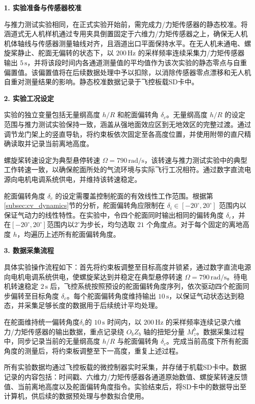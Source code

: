 \textbf{1. 实验准备与传感器校准}

与推力测试实验相同，在正式实验开始前，需完成力/力矩传感器的静态校准。将涵道式无人机样机通过专用夹具倒置固定于六维力/力矩传感器之上，确保无人机机体轴线与传感器测量轴线对齐，且涵道出口平面保持水平。在无人机未通电、螺旋桨静止、舵面无偏转的状态下，以 $200\,\mathrm{Hz}$ 的采样频率连续采集力/力矩传感器输出 $5\,\mathrm{s}$，并将该段时间内各通道测量值的平均值作为该次实验的静态零点与自重偏置值。该偏置值将在后续数据处理中予以扣除，以消除传感器零点漂移和无人机自重对测量结果的影响。静态校准数据记录于飞控板载SD卡中。

\textbf{2. 实验工况设定}

实验的独立变量包括无量纲高度 $h/R$ 和舵面偏转角 $\delta_c$。无量纲高度 $h/R$ 的设定范围与推力测试实验保持一致，涵盖从强地面效应区到无地效区的完整过渡。通过调节龙门架上的竖直导轨，将约束板依次固定至各高度位置，并使用附带的直尺精确读取并记录当前离地高度。

螺旋桨转速设定为典型悬停转速 $\Omega = 790\,\mathrm{rad/s}$，该转速与推力测试实验中的典型工作转速一致，以确保舵面所处的气流环境与实际飞行工况相符。通过数字直流电源向电机电调系统供电，并维持该转速稳定。

舵面偏转角度 $\delta_c$ 的设定需覆盖控制舵面的有效线性工作范围。根据第\ref{subsec:cv_dynamics}节的分析，舵面偏转角应限制在 $\delta_i \in [-20^\circ, 20^\circ]$ 范围内以保证气动力的线性特性。在实验中，令四个舵面同时输出相同的偏转角度 $\delta_c$，并在$[-20^\circ, 20^\circ]$范围内以$2^\circ$为步长，均匀选取 $21$ 个角度点。对于每个固定的离地高度 $h$，均遍历上述所有舵面偏转角度。

\textbf{3. 数据采集流程}

具体实验操作流程如下：首先将约束板调整至目标高度并锁紧，通过数字直流电源向电机电调系统供电，使螺旋桨达到并稳定在典型悬停转速 $\Omega = 790\,\mathrm{rad/s}$。待电机转速稳定 $2\,\mathrm{s}$ 后，飞控系统按照预设的舵面偏转角度序列，依次驱动四个舵面同步偏转至目标角度 $\delta_c$。每个舵面偏转角度维持输出 $10\,\mathrm{s}$，以保证气动状态达到稳态，并采集足够长度的数据用于后续统计平均处理。

在舵面维持统一偏转角度$\delta_c$的 $10\,\mathrm{s}$ 时间内，以 $200\,\mathrm{Hz}$ 的采样频率连续记录六维力/力矩传感器的输出数据，重点记录绕 $O_bZ_b$ 轴的扭矩分量 $M_{z}^b$。数据采集过程中，同步记录当前的无量纲高度 $h/R$ 与舵面偏转角 $\delta_c$。完成当前高度下所有舵面角度的测量后，将约束板调整至下一高度，重复上述过程。

所有实验数据均通过飞控板载的微控制器实时采集，并存储于机载SD卡中。数据记录的内容包括：时间戳、六维力/力矩传感器各通道原始数值、螺旋桨转速反馈值、当前离地高度以及舵面偏转角度指令。实验结束后，将SD卡中的数据导出至计算机，供后续的数据预处理与参数拟合使用。

